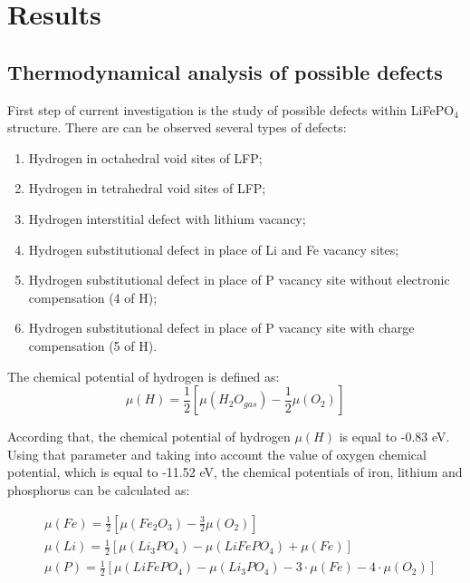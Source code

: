 \chapter{Results}

\section{Thermodynamical analysis of possible defects}

First step of current investigation is the study of possible defects within LiFePO$_4$ structure. There are can be observed several types of defects:
\begin{enumerate} 
	\item Hydrogen in octahedral void sites of LFP;
	\item Hydrogen in tetrahedral void sites of LFP;
	\item Hydrogen interstitial defect with lithium vacancy;
	\item Hydrogen substitutional defect in place of Li and Fe vacancy sites;
	\item Hydrogen substitutional defect in place of P vacancy site without electronic compensation (4 of H);
	\item Hydrogen substitutional defect in place of P vacancy site with charge compensation (5 of H).
\end{enumerate}

The chemical potential of hydrogen is defined as:
\begin{equation}
    \mu(H)=\frac{1}{2}[\mu(H_2O_{gas})-\frac{1}{2}\mu(O_2)]
\end{equation}

According that, the chemical potential of hydrogen $\mu(H)$ is equal to -0.83 eV. Using that parameter and taking into account the value of oxygen chemical potential, which is equal to  -11.52 eV, the chemical potentials of iron, lithium and phosphorus can be calculated as:

\begin{eqnarray}
\label{FeLiP}
  &\mu(Fe)=\frac{1}{2}[\mu(Fe_2O_3)-\frac{3}{2}\mu(O_2)] \nonumber \\ 
  &\mu(Li)=\frac{1}{2}[\mu(Li_3PO_4)-\mu(LiFePO_4)+\mu(Fe)] \\
  &\mu(P)=\frac{1}{2}[\mu(LiFePO_4)-\mu(Li_3PO_4)-3\cdot\mu(Fe)-4\cdot\mu(O_2)] \nonumber
\end{eqnarray}

